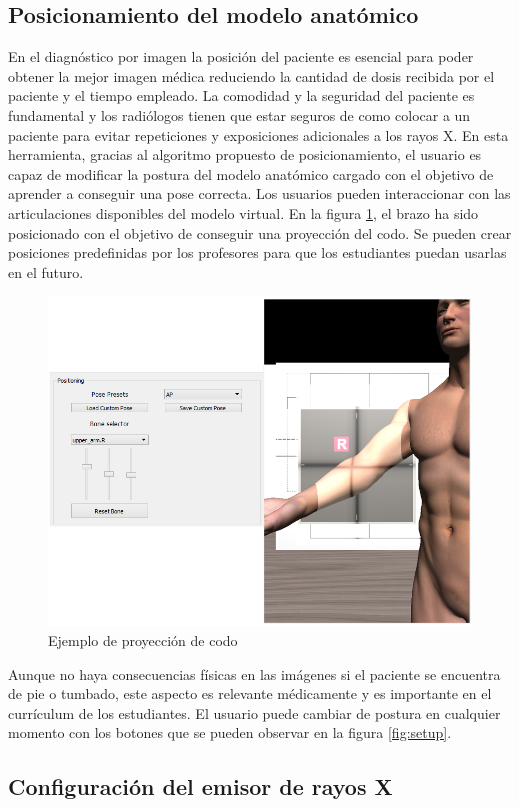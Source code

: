 \subsection{Posicionamiento del modelo anatómico}
\label{xray:posing}
En el diagnóstico por imagen la posición del paciente es esencial para poder obtener la mejor imagen médica reduciendo la cantidad de dosis recibida por el paciente y el tiempo empleado. La comodidad y la seguridad del paciente es fundamental y los radiólogos tienen que estar seguros de como colocar a un paciente para evitar repeticiones y exposiciones adicionales a los rayos X. En esta herramienta, gracias al algoritmo propuesto de posicionamiento, el usuario es capaz de modificar la postura del modelo anatómico cargado con el objetivo de aprender a conseguir una pose correcta. Los usuarios pueden interaccionar con las articulaciones disponibles del modelo virtual. En la figura \ref{fig:pose}, el brazo ha sido posicionado con el objetivo de conseguir una proyección del codo. Se pueden crear posiciones predefinidas por los profesores para que los estudiantes puedan usarlas en el futuro.



\begin{figure}[h]
\centering
\includegraphics[width=0.5\linewidth]{IMG/Pose.png}
\caption{\label{fig:pose}Ejemplo de proyección de codo }
\end{figure}

Aunque no haya consecuencias físicas en las imágenes si el paciente se encuentra de pie o tumbado, este aspecto es relevante médicamente y es importante en el currículum de los estudiantes. El usuario puede cambiar de postura en cualquier momento con los botones que se pueden observar en la figura \ref{fig:setup}.




\subsection{Configuración del emisor de rayos X}
\label{xray:setupxray}


